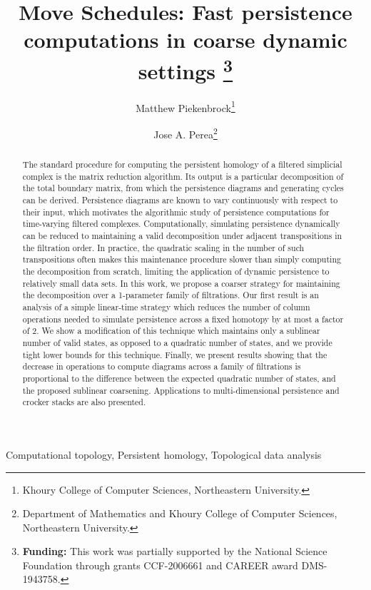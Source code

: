 \documentclass{article} %
\title{
	Move Schedules: Fast persistence computations in coarse dynamic settings
	\thanks{
	\textbf{Funding:} This work was partially supported by the National Science Foundation through grants CCF-2006661 and CAREER award DMS-1943758.
	}
}
\author{
	Matthew Piekenbrock\thanks{Khoury College of Computer Sciences, Northeastern University.}
	\and Jose A. Perea\thanks{
	Department of Mathematics and Khoury College of Computer Sciences, Northeastern University.}
}
\begin{document}
 

\maketitle

\begin{abstract}
	The standard procedure for computing the persistent homology of a filtered simplicial complex is the matrix reduction algorithm. Its output is a particular decomposition of the total boundary matrix, from which the persistence diagrams and generating cycles can be derived. 
	Persistence diagrams are known to vary continuously with respect to their input, which motivates the algorithmic study of persistence computations for time-varying filtered complexes. Computationally, simulating persistence dynamically can be reduced to maintaining a valid decomposition under adjacent transpositions in the filtration order. 
	In practice, the quadratic scaling in the number of  such transpositions often makes this maintenance procedure slower than simply computing the decomposition from scratch,  limiting the application of dynamic persistence to relatively small data sets. In this work, we propose a coarser strategy for maintaining the decomposition over a 1-parameter family of filtrations. Our first result is an analysis of a simple linear-time strategy which reduces the number of column operations needed to simulate persistence across a fixed homotopy by at most a factor of 2. We show a modification of this technique which maintains only a sublinear number of valid states, as opposed to a quadratic number of states, and we provide tight lower bounds for this technique.
	Finally, we present results showing that the decrease in operations to compute diagrams across a family of filtrations is proportional to the difference between the expected quadratic number of states, and the proposed sublinear coarsening.
	Applications to multi-dimensional persistence and crocker stacks are also presented.
\end{abstract}

\begin{keywords}
  {Computational topology, Persistent homology, Topological data analysis}
\end{keywords}
\end{document}
